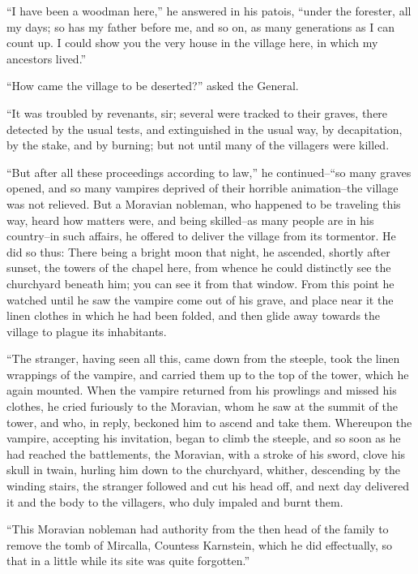 \documentclass[11pt,twoside,makeidx,hidelinks,]{memoir}
\begin{document}
``I have been a woodman here,'' he answered in his patois, ``under the
forester, all my days; so has my father before me, and so on, as many
generations as I can count up. I could show you the very house in the
village here, in which my ancestors lived.''

``How came the village to be deserted?'' asked the General.

``It was troubled by revenants, sir; several were tracked to their
graves, there detected by the usual tests, and extinguished in the usual
way, by decapitation, by the stake, and by burning; but not until many
of the villagers were killed.

``But after all these proceedings according to law,'' he continued--``so
many graves opened, and so many vampires deprived of their horrible
animation--the village was not relieved. But a Moravian nobleman, who
happened to be traveling this way, heard how matters were, and being
skilled--as many people are in his country--in such affairs, he offered
to deliver the village from its tormentor. He did so thus: There being a
bright moon that night, he ascended, shortly after sunset, the towers of
the chapel here, from whence he could distinctly see the churchyard
beneath him; you can see it from that window. From this point he watched
until he saw the vampire come out of his grave, and place near it the
linen clothes in which he had been folded, and then glide away towards
the village to plague its inhabitants.

``The stranger, having seen all this, came down from the steeple, took
the linen wrappings of the vampire, and carried them up to the top of
the tower, which he again mounted. When the vampire returned from his
prowlings and missed his clothes, he cried furiously to the Moravian,
whom he saw at the summit of the tower, and who, in reply, beckoned him
to ascend and take them. Whereupon the vampire, accepting his
invitation, began to climb the steeple, and so soon as he had reached
the battlements, the Moravian, with a stroke of his sword, clove his
skull in twain, hurling him down to the churchyard, whither, descending
by the winding stairs, the stranger followed and cut his head off, and
next day delivered it and the body to the villagers, who duly impaled
and burnt them.

``This Moravian nobleman had authority from the then head of the family
to remove the tomb of Mircalla, Countess Karnstein, which he did
effectually, so that in a little while its site was quite forgotten.''
\end{document}
